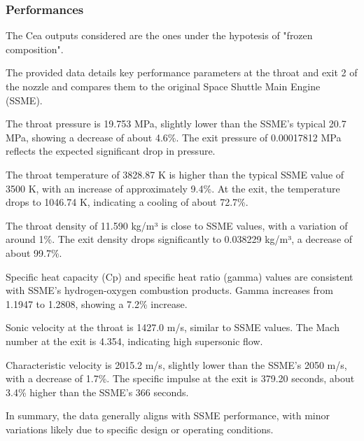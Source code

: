 \subsubsection{Performances}

The Cea outputs considered are the ones under the hypotesis of "frozen composition".

The provided data details key performance parameters at the throat and exit 2 of the nozzle and compares them to the original Space Shuttle Main Engine (SSME).

The throat pressure is 19.753 MPa, slightly lower than the SSME's typical 20.7 MPa, showing a decrease of about 4.6\%. The exit pressure of 0.00017812 MPa reflects the expected significant drop in pressure.

The throat temperature of 3828.87 K is higher than the typical SSME value of 3500 K, with an increase of approximately 9.4\%. At the exit, the temperature drops to 1046.74 K, indicating a cooling of about 72.7\%.

The throat density of 11.590 kg/m³ is close to SSME values, with a variation of around 1\%. The exit density drops significantly to 0.038229 kg/m³, a decrease of about 99.7\%.

Specific heat capacity (Cp) and specific heat ratio (gamma) values are consistent with SSME's hydrogen-oxygen combustion products. Gamma increases from 1.1947 to 1.2808, showing a 7.2\% increase.

Sonic velocity at the throat is 1427.0 m/s, similar to SSME values. The Mach number at the exit is 4.354, indicating high supersonic flow.

Characteristic velocity is 2015.2 m/s, slightly lower than the SSME’s 2050 m/s, with a decrease of 1.7\%. The specific impulse at the exit is 379.20 seconds, about 3.4\% higher than the SSME's 366 seconds.

In summary, the data generally aligns with SSME performance, with minor variations likely due to specific design or operating conditions.

